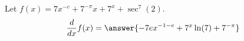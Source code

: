 \documentclass{ximera}
\begin{document}
\begin{shuffle}



\begin{exercise}
Let $f(x)=7 x^{-e}+7^{-\pi } x+7^x+\sec ^7(2)$.
\[
\ddx f(x) = \answer{-7 e x^{-1-e}+7^x \ln (7)+7^{-\pi }}
\]
\end{exercise}

\end{shuffle}
\end{document}
